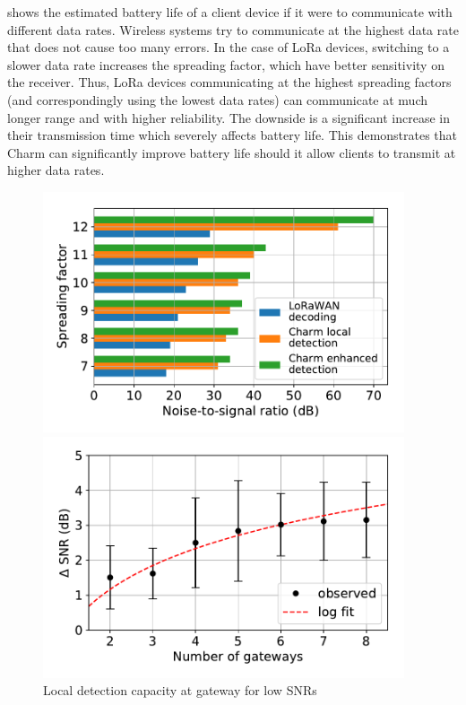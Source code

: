  shows the estimated battery life of a client
device if it were to communicate with different data rates. Wireless systems
try to communicate at the highest data rate that does not cause too many
errors. In the case of LoRa devices, switching to a slower data rate increases
the spreading factor,  which have better sensitivity on the receiver. Thus,
LoRa devices communicating at the highest spreading factors (and
correspondingly using the lowest data rates) can communicate at much longer
range and with higher reliability. The downside is a significant increase in
their transmission time which severely affects battery life. This demonstrates
that Charm can significantly improve battery life should it allow clients to
transmit at higher data rates.

\begin{figure}
\hfill
\begin{minipage}{.32\textwidth}
\centering
\includegraphics[width=0.95\textwidth]{figures/local_detection_limits}
\hspace*{-0.1in}
\caption{Local detection capacity at gateway for low SNRs}
\label{fig:local-detection}
\compactimg
\end{minipage}
\hfill
\begin{minipage}{.32\textwidth}
\centering
\includegraphics[width=0.95\textwidth]{figures/diversity_gain}

\end{minipage}
\end{figure}
